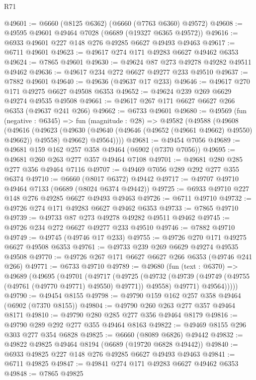\begin{lexlean}{R71}
\begin{coremodule}
@49601 := @6660 (@8125 @6362) (@6660 (@7763 @6360) @49572)
@49608 := @49595 @49601 @49464 @7028 (@6689 (@19327 @6365 @49572))
@49616 := @6933 @49601 @227 @148 @276 @49285 @6627 @49493 @49463
@49617 := @6711 @49601
@49623 := @49617 @274 @171 @49283 @6627 @49462 @6353
@49624 := @7865 @49601
@49630 := @49624 @87 @273 @49278 @49282 @49511 @49462
@49636 := @49617 @234 @272 @6627 @49277 @233 @49510
@49637 := @7882 @49601
@49640 := @49636 (@49637 @17 @233)
@49646 := @49617 @270 @171 @49275 @6627 @49508 @6353
@49652 := @49624 @239 @269 @6629 @49274 @49535 @49508
@49661 := @49617 @267 @171 @6627 @6627 @266 @6353 (@49637 @241 @266)
@49662 := @6733 @49601
@49680 := @49569
    (fun (negative : @6345) =>
    fun (magnitude : @28) =>
    @49582
      (@49588
        (@49608
          (@49616
            (@49623 (@49630 (@49640 (@49646 (@49652 (@49661 @49662) @49550) @49662)) @49558) @49662)
            @49564))))
@49681 := @49454 @7056
@49689 := @49681 @159 @162 @257 @358 @49464 (@6902 (@7370 @7056))
@49695 := @49681 @260 @263 @277 @357 @49464 @7108
@49701 := @49681 @280 @285 @277 @356 @49464 @7116
@49707 := @49469 @7056 @289 @292 @277 @355 @6374
@49710 := @6660 (@8017 @6372) @49442
@49717 := @49707 @49710 @49464 @7133 (@6689 (@8024 @6374 @49442))
@49725 := @6933 @49710 @227 @148 @276 @49285 @6627 @49493 @49463
@49726 := @6711 @49710
@49732 := @49726 @274 @171 @49283 @6627 @49462 @6353
@49733 := @7865 @49710
@49739 := @49733 @87 @273 @49278 @49282 @49511 @49462
@49745 := @49726 @234 @272 @6627 @49277 @233 @49510
@49746 := @7882 @49710
@49749 := @49745 (@49746 @17 @233)
@49755 := @49726 @270 @171 @49275 @6627 @49508 @6353
@49761 := @49733 @239 @269 @6629 @49274 @49535 @49508
@49770 := @49726 @267 @171 @6627 @6627 @266 @6353 (@49746 @241 @266)
@49771 := @6733 @49710
@49789 := @49680
    (fun (text : @6370) =>
    @49689
      (@49695
        (@49701
          (@49717
            (@49725
              (@49732
                (@49739 (@49749 (@49755 (@49761 (@49770 @49771) @49550) @49771)) @49558)
                @49771)
              @49564)))))
@49790 := @49454 @8155
@49798 := @49790 @159 @162 @257 @358 @49464 (@6902 (@7370 @8155))
@49804 := @49790 @260 @263 @277 @357 @49464 @8171
@49810 := @49790 @280 @285 @277 @356 @49464 @8179
@49816 := @49790 @289 @292 @277 @355 @49464 @8163
@49822 := @49469 @8155 @296 @303 @277 @354 @6828
@49825 := @6660 (@8089 @6826) @49442
@49832 := @49822 @49825 @49464 @8194 (@6689 (@19720 @6828 @49442))
@49840 := @6933 @49825 @227 @148 @276 @49285 @6627 @49493 @49463
@49841 := @6711 @49825
@49847 := @49841 @274 @171 @49283 @6627 @49462 @6353
@49848 := @7865 @49825

\end{coremodule}
\end{lexlean}
